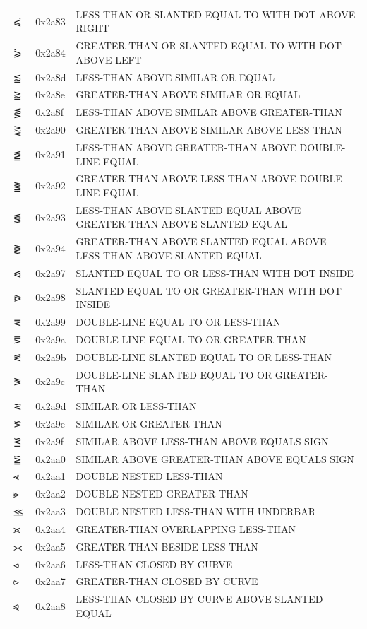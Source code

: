 \documentclass[12pt, twoside]{article}
\begin{document}
\begin{longtable}{L{1.0cm} L{2.0cm} >{\footnotesize}L{10cm}}
$⪃$&0x2a83&LESS-THAN OR SLANTED EQUAL TO WITH DOT ABOVE RIGHT\\
$⪄$&0x2a84&GREATER-THAN OR SLANTED EQUAL TO WITH DOT ABOVE LEFT\\
$⪍$&0x2a8d&LESS-THAN ABOVE SIMILAR OR EQUAL\\
$⪎$&0x2a8e&GREATER-THAN ABOVE SIMILAR OR EQUAL\\
$⪏$&0x2a8f&LESS-THAN ABOVE SIMILAR ABOVE GREATER-THAN\\
$⪐$&0x2a90&GREATER-THAN ABOVE SIMILAR ABOVE LESS-THAN\\
$⪑$&0x2a91&LESS-THAN ABOVE GREATER-THAN ABOVE DOUBLE-LINE EQUAL\\
$⪒$&0x2a92&GREATER-THAN ABOVE LESS-THAN ABOVE DOUBLE-LINE EQUAL\\
$⪓$&0x2a93&LESS-THAN ABOVE SLANTED EQUAL ABOVE GREATER-THAN ABOVE SLANTED EQUAL\\
$⪔$&0x2a94&GREATER-THAN ABOVE SLANTED EQUAL ABOVE LESS-THAN ABOVE SLANTED EQUAL\\
$⪗$&0x2a97&SLANTED EQUAL TO OR LESS-THAN WITH DOT INSIDE\\
$⪘$&0x2a98&SLANTED EQUAL TO OR GREATER-THAN WITH DOT INSIDE\\
$⪙$&0x2a99&DOUBLE-LINE EQUAL TO OR LESS-THAN\\
$⪚$&0x2a9a&DOUBLE-LINE EQUAL TO OR GREATER-THAN\\
$⪛$&0x2a9b&DOUBLE-LINE SLANTED EQUAL TO OR LESS-THAN\\
$⪜$&0x2a9c&DOUBLE-LINE SLANTED EQUAL TO OR GREATER-THAN\\
$⪝$&0x2a9d&SIMILAR OR LESS-THAN\\
$⪞$&0x2a9e&SIMILAR OR GREATER-THAN\\
$⪟$&0x2a9f&SIMILAR ABOVE LESS-THAN ABOVE EQUALS SIGN\\
$⪠$&0x2aa0&SIMILAR ABOVE GREATER-THAN ABOVE EQUALS SIGN\\
$⪡$&0x2aa1&DOUBLE NESTED LESS-THAN\\
$⪢$&0x2aa2&DOUBLE NESTED GREATER-THAN\\
$⪣$&0x2aa3&DOUBLE NESTED LESS-THAN WITH UNDERBAR\\
$⪤$&0x2aa4&GREATER-THAN OVERLAPPING LESS-THAN\\
$⪥$&0x2aa5&GREATER-THAN BESIDE LESS-THAN\\
$⪦$&0x2aa6&LESS-THAN CLOSED BY CURVE\\
$⪧$&0x2aa7&GREATER-THAN CLOSED BY CURVE\\
$⪨$&0x2aa8&LESS-THAN CLOSED BY CURVE ABOVE SLANTED EQUAL\\

\end{longtable}
\end{document}
